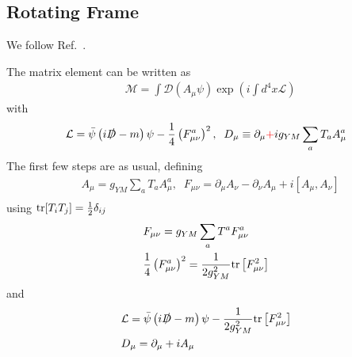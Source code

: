 \subsection{\label{sec:RotatingFrame}Rotating Frame}

We follow Ref.~\cite{rotation}.

The matrix element can be written as
\begin{equation}
\begin{split}
&\mathcal{M}=\int \mathcal{D}(A_{\mu}\psi)\exp \left(i\int d^4x \mathcal{L}\right)
\end{split}
\end{equation}
with
\begin{equation}
\begin{split}
&\mathcal{L}=\bar{\psi}\left(i\slashed {D}-m\right)\psi-\frac{1}{4}\left(F^a_{\mu\nu}\right)^2,\;\;D_{\mu}\equiv \partial _{\mu}\textcolor[rgb]{1,0,0}{+}ig_{YM}\sum _a T_aA^a_{\mu}\\
\end{split}
\end{equation}
The first few steps are as usual, defining
\begin{equation}
\begin{split}
&A_{\mu}=g_{YM}\sum _a T_aA^a_{\mu},\;\;F_{\mu\nu}=\partial _{\mu}A_{\nu}-\partial _{\nu}A_{\mu}+i[A_{\mu},A_{\nu}]\\
\end{split}
\end{equation}
using ${\rm tr}[T_iT_j]=\frac{1}{2}\delta _{ij}$
\begin{equation}
\begin{split}
&F_{\mu\nu}=g_{YM}\sum _aT^a F^a_{\mu\nu}\\
&\frac{1}{4}\left(F^a_{\mu\nu}\right)^2=\frac{1}{2g_{YM}^2}{\rm tr}\left[F_{\mu\nu}^2\right]\\
\end{split}
\end{equation}
and
\begin{equation}
\begin{split}
&\mathcal{L}=\bar{\psi}\left(i\slashed {D}-m\right)\psi-\frac{1}{2g_{YM}^2}{\rm tr}\left[F_{\mu\nu}^2\right]\\
&D_{\mu}=\partial _{\mu}+iA_{\mu}\\
\end{split}
\end{equation}

